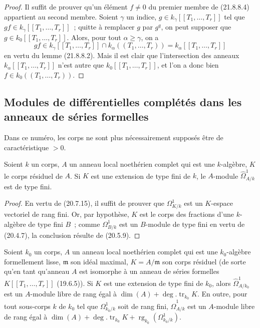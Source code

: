 \begin{proof}
Il suffit de prouver qu'un élément $f\ne0$ du premier membre de (21.8.8.4)
appartient au second membre. Soient $\gamma$ un indice,
$g\in k_\gamma[[T_1,\ldots,T_r]]$ tel
que
$gf\in k_\gamma[[T_1,\ldots,T_r]]$~; quitte à remplacer $g$ par $g^q$, on
peut supposer que $g\in k_0[[T_1,\ldots,T_r]]$. Alors, pour tout
$\alpha\geqslant\gamma$, on a
\[
  gf\in k_\gamma[[T_1,\ldots,T_r]]\cap k_\alpha((T_1,\ldots,T_r))
  =k_\alpha[[T_1,\ldots,T_r]]
\]
en vertu du lemme (21.8.8.2). Mais il est clair que l'intersection des
anneaux $k_\alpha[[T_1,\ldots,T_r]]$ n'est autre que
$k_0[[T_1,\ldots,T_r]]$, et l'on a donc bien
$f\in k_0((T_1,\ldots,T_r))$.
\end{proof}

\subsection{Modules de différentielles complétés dans les anneaux de séries formelles}
\label{subsection:0.21.9-fr}

Dans ce numéro, les corps ne sont plus nécessairement supposés être de
caractéristique $>0$.

\begin{lemma}[21.9.1]
\label{0.21.9.1-fr}
Soient $k$ un corps, $A$ un anneau local noethérien complet qui est une
$k$-algèbre, $K$ le corps résiduel de $A$. Si $K$ est une extension de type
fini de $k$, le $A$-module $\widehat\Omega^1_{A/k}$ est de type fini.
\end{lemma}

\begin{proof}
En vertu de (20.7.15), il suffit de prouver que $\Omega^1_{K/k}$ est un
$K$-espace vectoriel de rang fini. Or, par hypothèse, $K$ est le corps des
fractions d'une $k$-algèbre de type fini $B$~; comme $\Omega^1_{B/k}$ est un
$B$-module de type fini en vertu de (20.4.7), la conclusion résulte de
(20.5.9).
\end{proof}

\begin{proposition}[21.9.2]
\label{0.21.9.2-fr}
Soient $k_0$ un corps, $A$ un anneau local noethérien complet qui est une
$k_0$-algèbre formellement lisse, $\mathfrak m$ son idéal maximal,
$K=A/\mathfrak m$ son corps résiduel (de sorte qu'en tant qu'anneau $A$ est
isomorphe à un anneau de séries formelles $K[[T_1,\ldots,T_r]]$ (19.6.5)).
Si $K$ est une extension de type fini de $k_0$, alors
$\widehat\Omega^1_{A/k_0}$ est un $A$-module libre de rang égal à
$\dim(A)+\deg.\operatorname{tr}_{k_0}K$. En outre, pour tout sous-corps $k$
de $k_0$ tel que $\Omega^1_{k_0/k}$ soit de rang fini,
$\widehat\Omega^1_{A/k}$ est un $A$-module libre de rang égal à
$\dim(A)+\deg.\operatorname{tr}_{k_0}K+\operatorname{rg}_{k_0}(\Omega^1_{k_0/k})$.
\end{proposition}

